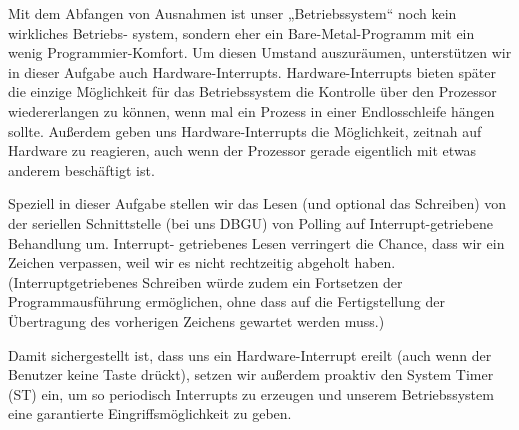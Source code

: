 \begin{description}

Mit dem Abfangen von Ausnahmen ist unser „Betriebssystem“ noch kein wirkliches Betriebs-
system, sondern eher ein Bare-Metal-Programm mit ein wenig Programmier-Komfort. Um 
diesen Umstand auszuräumen, unterstützen wir in dieser Aufgabe auch Hardware-Interrupts. 
Hardware-Interrupts bieten später die einzige Möglichkeit für das Betriebssystem die Kontrolle 
über den Prozessor wiedererlangen zu können, wenn mal ein Prozess in einer Endlosschleife 
hängen sollte. Außerdem geben uns Hardware-Interrupts die Möglichkeit, zeitnah auf Hardware 
zu reagieren, auch wenn der Prozessor gerade eigentlich mit etwas anderem beschäftigt ist. 

Speziell in dieser Aufgabe stellen wir das Lesen (und optional das Schreiben) von der seriellen 
Schnittstelle (bei uns DBGU) von Polling auf Interrupt-getriebene Behandlung um. Interrupt-
getriebenes Lesen verringert die Chance, dass wir ein Zeichen verpassen, weil wir es nicht 
rechtzeitig abgeholt haben. (Interruptgetriebenes Schreiben würde zudem ein Fortsetzen der 
Programmausführung ermöglichen, ohne dass auf die Fertigstellung der Übertragung des 
vorherigen Zeichens gewartet werden muss.) 

Damit sichergestellt ist, dass uns ein Hardware-Interrupt ereilt (auch wenn der Benutzer keine 
Taste drückt), setzen wir außerdem proaktiv den System Timer (ST) ein, um so periodisch 
Interrupts zu erzeugen und unserem Betriebssystem eine garantierte Eingriffsmöglichkeit zu 
geben. 
  


\end{description}

